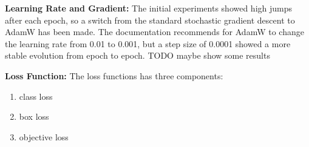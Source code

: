 \textbf{Learning Rate and Gradient:}
The initial experiments showed high jumps after each epoch, so a switch from the standard stochastic gradient descent to AdamW has been made. The documentation recommends for AdamW to change the learning rate from 0.01 to 0.001, but a step size of 0.0001 showed a more stable evolution from epoch to epoch.
TODO maybe show some results

\textbf{Loss Function:}
The loss functions has three components:
\begin{enumerate}
  \item class loss
  \item box loss
  \item objective loss
\end{enumerate}

